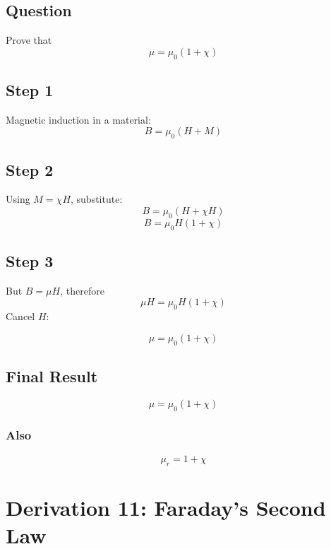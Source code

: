 \documentclass[11pt,a4paper]{article}
\begin{document}
\subsection*{Question}
Prove that
\[ \mu = \mu_0(1+\chi) \]

\subsection*{Step 1}
Magnetic induction in a material:
\[ B = \mu_0(H+M) \]

\subsection*{Step 2}
Using \( M = \chi H \), substitute:
\[ B = \mu_0(H+\chi H) \]
\[ B = \mu_0 H(1+\chi) \]

\subsection*{Step 3}
But \( B = \mu H \), therefore
\[ \mu H = \mu_0 H(1+\chi) \]
Cancel \( H \):
\begin{tcolorbox}[colback=RoyalBlue!5!white, colframe=RoyalBlue]
    \[ \mu = \mu_0(1+\chi) \]
\end{tcolorbox}

\subsection*{Final Result}
\begin{tcolorbox}[colback=RoyalBlue!5!white, colframe=RoyalBlue]
    \[ \mu = \mu_0(1+\chi) \]
\end{tcolorbox}

\subsubsection*{Also}
\begin{tcolorbox}[colback=RoyalBlue!5!white, colframe=RoyalBlue]
    \[ \mu_r = 1+\chi \]
\end{tcolorbox}

\newpage

\section{Derivation 11: Faraday's Second Law}
\end{document}

